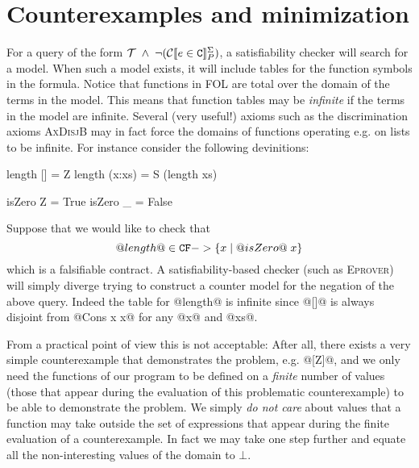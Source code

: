 \documentclass[preprint,nocopyrightspace,draft]{sigplanconf}
\begin{document}
\section{Counterexamples and minimization}

For a query of the form ${\cal T}\;\land\;\neg(\ctrans{\Sigma}{P}{e \in \Ct})$, a satisfiability checker will search for
a model. When such a model exists, it will include tables for the function symbols in the formula. Notice that functions 
in FOL are total over the domain of the terms in the model. This means that function tables may be {\em infinite} if the 
terms in the model are infinite. Several (very useful!) axioms such as the discrimination axioms \textsc{AxDisjB} may in 
fact force the domains of functions operating e.g. on lists to be infinite. For instance consider the following devinitions:
\begin{code}
length [] = Z
length (x:xs) = S (length xs)

isZero Z = True
isZero _ = False
\end{code}
Suppose that we would like to check that 
   \[ @length@ \in \CF -> \{ x \mid @isZero@\;x\} \]
which is a falsifiable contract.  A satisfiability-based checker (such as \textsc{Eprover})
will simply diverge trying to construct a counter model for the negation of the above query.
Indeed the table for @length@ is infinite since @[]@ is always disjoint from @Cons x x@ for 
any @x@ and @xs@.

From a practical point of view this is not acceptable: After all, there exists a very simple 
counterexample that demonstrates the problem, e.g. @[Z]@, and we only need the 
functions of our program to be defined on a {\em finite} number of values (those that appear 
during the evaluation of this problematic counterexample) to be able to demonstrate 
the problem. We simply {\em do not care} about values that a function may take outside the set 
of expressions that appear during the finite evaluation of a counterexample. In fact we may take
one step further and equate all the non-interesting values of the domain to $\bot$.
\end{document}

